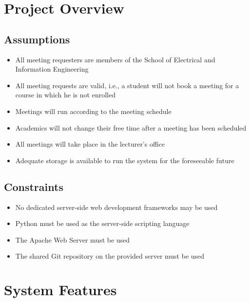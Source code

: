 \documentclass[11pt, a4paper]{article}
\begin{document}
	\section{Project Overview}
	\subsection{Assumptions}
	\begin{itemize}
		\item All meeting requesters are members of the School of Electrical and Information Engineering
		\item All meeting requests are valid, i.e., a student will not book  a meeting for a course in which he is not enrolled
		\item Meetings will run according to the meeting schedule
		\item Academics will not change their free time after a meeting has been scheduled
		\item All meetings will take place in the lecturer's office
		\item Adequate storage is available to run the system for the foreseeable future
	\end{itemize}
	
	\subsection{Constraints}
	\begin{itemize}
		\item No dedicated server-side web development frameworks may be used
		\item Python must be used as the server-side scripting language
		\item The Apache Web Server must be used
		\item The shared Git repository on the provided server must be used
	\end{itemize}

	
	
	\section{System Features}
	
\end{document}
